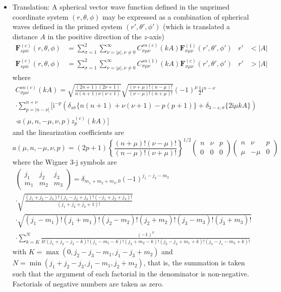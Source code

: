\documentclass[a4paper,12pt]{article}
\renewcommand{\vec}[1]{\boldsymbol{#1}}
\newcommand{\mrm}[1]{\mathrm{#1}}
\newcommand{\iu}{\mrm{i}}
\newcommand{\Fv}{\vec{F}}
\begin{document}
\begin{itemize}
\item Translation: A spherical vector wave function defined in the
  unprimed coordinate system $(r,\theta,\phi)$ may be expressed as a
  combination of spherical waves defined in the primed system
  $(r',\theta',\phi')$ (which is translated a distance $A$ in the
  positive direction of the $z$-axis)
  \begin{align}
    \Fv_{s\mu n}^{(c)}(r,\theta,\phi) &= \sum_{\sigma=1}^{2} \sum_{\nu=|\mu|,\nu\neq0}^{\infty} C_{\sigma\mu\nu}^{sn(c)}(kA) \Fv_{\sigma\mu\nu}^{(1)}(r',\theta',\phi') & r'&<|A| \\
    \Fv_{s\mu n}^{(c)}(r,\theta,\phi) &= \sum_{\sigma=1}^{2} \sum_{\nu=|\mu|,\nu\neq0}^{\infty} C_{\sigma\mu\nu}^{sn(1)}(kA) \Fv_{\sigma\mu\nu}^{(c)}(r',\theta',\phi') & r'&>|A| 
  \end{align}
  where
  \begin{multline}
    C_{\sigma\mu\nu}^{sn(c)}(kA) = \sqrt{\frac{(2n+1)(2\nu+1)}{n(n+1)\nu(\nu+1)}} \sqrt{\frac{(\nu+\mu)!(n-\mu)!}{(\nu-\mu)!(n+\mu)!}} (-1)^{\mu} \frac{1}{2} \iu^{n-\nu} \\
    \cdot \sum_{p=|n-\nu|}^{n+\nu} \Big[ \iu^{-p}(\delta_{s\sigma}\{n(n+1) + \nu(\nu+1) - p(p+1)\} + \delta_{3-s,\sigma}\{2\iu\mu kA\}) \\
    \cdot a(\mu,n,-\mu,\nu,p) z_{p}^{(c)}(kA) \Big]
  \end{multline}
  and the linearization coefficients are
  \begin{equation}
    a(\mu,n,-\mu,\nu,p) = (2p+1) \left\{\frac{(n+\mu)!(\nu-\mu)!}{(n-\mu)!(\nu+\mu)!}\right\}^{1/2}
    \begin{pmatrix}
      n & \nu & p \\
      0 & 0 & 0
    \end{pmatrix}
    \begin{pmatrix}
      n & \nu & p \\
      \mu & -\mu & 0
    \end{pmatrix}
  \end{equation}
  where the Wigner 3-j symbols are
  \begin{multline}
    \begin{pmatrix}
      j_{1} & j_{2} & j_{3} \\
      m_{1} & m_{2} & m_{3}
    \end{pmatrix} = \delta_{m_{1}+m_{2}+m_{3},0} (-1)^{j_{1}-j_{2}-m_{3}} \\
    \cdot\sqrt{\frac{(j_{1}+j_{2}-j_{3})!(j_{1}-j_{2}+j_{3})!(-j_{1}+j_{2}+j_{3})!}{(j_{1}+j_{2}+j_{3}+1)!}} \\
    \cdot \sqrt{(j_{1}-m_{1})!(j_{1}+m_{1})!(j_{2}-m_{2})!(j_{2}+m_{2})!(j_{3}-m_{3})!(j_{3}+m_{3})!} \\
    \cdot \sum_{k=K}^{N} \frac{(-1)^{k}}{k!(j_{1}+j_{2}-j_{3}-k)!(j_{1}-m_{1}-k)!(j_{2}+m_{2}-k)!(j_{3}-j_{2}+m_{1}+k)!(j_{3}-j_{1}-m_{2}+k)!}
  \end{multline}
  with $K=\max(0,j_{2}-j_{3}-m_{1},j_{1}-j_{3}+m_{2})$ and
  $N=\min(j_{1}+j_{2}-j_{3},j_{1}-m_{1},j_{2}+m_{2})$, that is, the
  summation is taken such that the argument of each factorial in the
  denominator is non-negative. Factorials of negative numbers are
  taken as zero.


\end{itemize}
\end{document}
